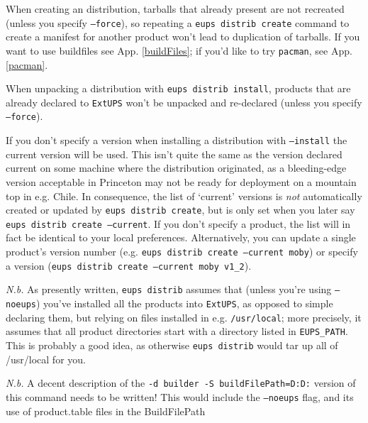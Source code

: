 \documentclass{article}
\newcommand{\code}[1]{\texttt{#1}}
\newcommand{\eups}{\code{ExtUPS}}
\newcommand{\pacman}{\code{pacman}}
\begin{document}
When creating an distribution, tarballs that already present are not recreated
(unless you specify \code{--force}),
so repeating a \code{eups distrib create} command to create a manifest for another
product won't lead to duplication of tarballs.  If you want to use buildfiles
see App. \ref{buildFiles}; if you'd like to try \pacman{}, see App. \ref{pacman}.

When unpacking a distribution with \code{eups distrib install}, products that are
already declared to \eups{} won't be unpacked and re-declared (unless you specify \code{--force}).

If you don't specify a version when installing a distribution with
\code{--install} the current version will be used.  This isn't quite the same
as the version declared current on some machine where the distribution
originated, as a bleeding-edge version acceptable in Princeton may not
be ready for deployment on a mountain top in e.g. Chile. In
consequence, the list of `current' versions is \textit{not}
automatically created or updated by \code{eups distrib create}, but is
only set when you later say \code{eups distrib create --current}.  If you don't specify
a product, the list will in fact be identical to your local preferences.
Alternatively, you can update a single product's version number (e.g.
\code{eups distrib create --current moby}) or specify a version (\code{eups distrib create --current moby v1\_2}).

\textit{N.b.} As presently written, \code{eups distrib} assumes that (unless you're
using \code{--noeups}) you've
installed all the products into \eups, as opposed to simple declaring them, but
relying on files installed in e.g. \code{/usr/local}; more precisely, it assumes
that all product directories start with a directory listed in \code{EUPS\_PATH}.
This is probably a good idea, as otherwise \code{eups distrib} would tar up
all of /usr/local for you.  

\textit{N.b.} A decent description of the \code{-d builder -S buildFilePath=D:D:} version of this command
needs to be written!  This would include the \code{--noeups} flag, and its use
of product.table files in the BuildFilePath
\end{document}
